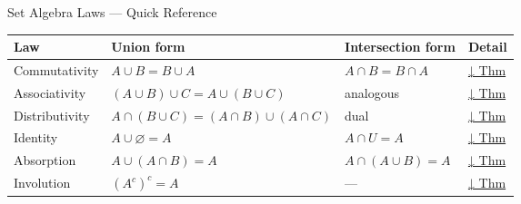 \begin{toolkitbox}{Set Algebra Laws — Quick Reference}
\small
\begin{tabular}{l l l l}
\toprule
\textbf{Law} & \textbf{Union form} & \textbf{Intersection form} & \textbf{Detail} \\
\midrule
Commutativity  & $A \cup B = B \cup A$          & $A \cap B = B \cap A$          & \hyperref[thm:commutativity]{↓ Thm} \\
Associativity  & $(A \cup B) \cup C = A \cup (B \cup C)$  & analogous   & \hyperref[thm:associativity]{↓ Thm} \\
Distributivity & $A \cap (B \cup C) = (A \cap B) \cup (A \cap C)$ & dual   & \hyperref[thm:distributivity]{↓ Thm} \\
Identity       & $A \cup \varnothing = A$        & $A \cap U = A$                 & \hyperref[thm:identity-absorption]{↓ Thm} \\
Absorption     & $A \cup (A \cap B) = A$         & $A \cap (A \cup B) = A$        & \hyperref[thm:identity-absorption]{↓ Thm} \\
Involution     & $(A^c)^c = A$                  & ---                            & \hyperref[thm:involution]{↓ Thm} \\
\bottomrule
\end{tabular}
\end{toolkitbox}


